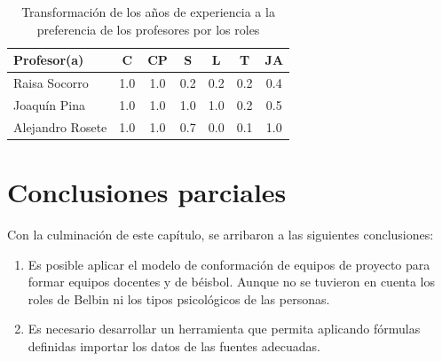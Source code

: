 %


\begin{table}[H]
	\centering
	\caption{Transformación de los años de experiencia a la preferencia de los profesores por los roles}\label{trans-prof}
	\hspace{-2cm}
	\begin{tabular}{l c c c c c c}
		\toprule[1.7pt]
		Profesor(a) & C   & CP  & S   & L   & T   & JA  \\ \midrule
		Raisa Socorro                             & 1.0 & 1.0 & 0.2 & 0.2 & 0.2 & 0.4 \\
		\rowcolor{gray!30} Joaquín Pina                              & 1.0 & 1.0 & 1.0 & 1.0 & 0.2 & 0.5 \\
		Alejandro Rosete                          & 1.0 & 1.0 & 0.7 & 0.0 & 0.1 & 1.0 \\
		\bottomrule[1pt]          
	\end{tabular}
\end{table}

\section{Conclusiones parciales}

Con la culminación de este capítulo, se arribaron a las siguientes conclusiones:
\begin{enumerate}
	\item Es posible aplicar el modelo de conformación de equipos de proyecto para formar equipos docentes y de béisbol. Aunque no se tuvieron en cuenta los roles de Belbin ni los tipos psicológicos de las personas.
	\item Es necesario desarrollar un herramienta que permita aplicando fórmulas definidas importar los datos de las fuentes adecuadas.
\end{enumerate}
